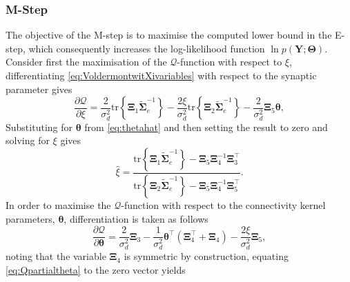 \documentclass[]{article}
\begin{document}
\subsubsection{M-Step}
The objective of the M-step is to maximise the computed lower bound in the E-step, which consequently increases the log-likelihood function $\ln p(\mathbf Y;\boldsymbol\Theta)$.                                                                                                                                                                                                                                                                                                                                                                                                                                  Consider first the maximisation of the $\mathcal{Q}$-function with respect to $\xi$, differentiating \eqref{eq:VoldermontwitXivariables} with respect to the synaptic parameter gives
\begin{equation}\label{eq:Qpartialxi}
 \frac{\partial \mathcal Q}{\partial\xi}=\frac{2}{\sigma_d^2}\mathrm{tr}\left\lbrace \boldsymbol\Xi_1 \tilde{\boldsymbol\Sigma}_e^{-1}\right\rbrace -\frac{2\xi}{\sigma_d^2}\mathrm{tr}\left\lbrace \boldsymbol\Xi_2 \tilde{\boldsymbol\Sigma}_e^{-1}\right\rbrace-\frac{2}{\sigma_d^2}\boldsymbol\Xi_5\boldsymbol\theta,
\end{equation}
Substituting for $\boldsymbol\theta$ from \eqref{eq:thetahat} and then setting the result to zero and solving for $\xi$ gives
\begin{equation}\label{eq:xihat}
 \hat{\xi}=\frac{\mathrm{tr}\left\lbrace \boldsymbol\Xi_1 \tilde{\boldsymbol\Sigma}_e^{-1}\right\rbrace-\boldsymbol\Xi_5\boldsymbol\Xi_4^{-1}\boldsymbol\Xi_3^\top}{\mathrm{tr}\left\lbrace \boldsymbol\Xi_2 \tilde{\boldsymbol\Sigma}_e^{-1}\right\rbrace-\boldsymbol\Xi_5\boldsymbol\Xi_4^{-1}\boldsymbol\Xi_5^{\top}}.
\end{equation}
In order to maximise the $\mathcal{Q}$-function with respect to the connectivity kernel parameters, $\boldsymbol\theta$, differentiation is taken as follows
\begin{equation}\label{eq:Qpartialtheta}
 \frac{\partial \mathcal Q}{\partial \boldsymbol\theta}=\frac{2}{\sigma_d^2}\boldsymbol\Xi_3-\frac{1}{\sigma_d^2}\boldsymbol\theta^\top(\boldsymbol\Xi_4^\top+\boldsymbol\Xi_4)-\frac{2\xi}{\sigma_d^2}\boldsymbol\Xi_5,
\end{equation}
noting that the variable $\boldsymbol\Xi_4$ is symmetric by construction, equating \eqref{eq:Qpartialtheta} to the zero vector yields
\end{document}
